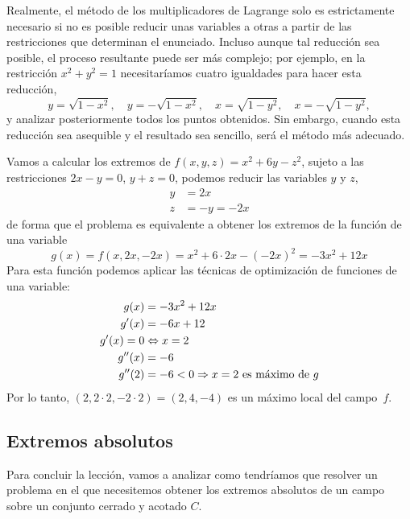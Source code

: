 Realmente, el método de los multiplicadores de Lagrange solo es estrictamente necesario si no es posible reducir unas variables a otras a partir de las restricciones que determinan el enunciado.
Incluso aunque tal reducción sea posible, el proceso resultante puede ser más complejo;
por ejemplo, en la restricción $x^2+y^2=1$ necesitaríamos cuatro igualdades para hacer esta reducción,
\[
y=\sqrt{1-x^2},\quad
y=-\sqrt{1-x^2},\quad
x=\sqrt{1-y^2},\quad
x=-\sqrt{1-y^2},
\]
y analizar posteriormente todos los puntos obtenidos.
Sin embargo, cuando esta reducción sea asequible y el resultado sea sencillo, será el método más adecuado.
%
\begin{ejemplo}
Vamos a calcular los extremos de $f(x,y,z)=x^2+6y-z^2$, sujeto a las restricciones $2x-y=0$, $y+z=0$, podemos reducir las variables $y$ y $z$,
\begin{align*}
y&=2x\\
z&=-y=-2x
\end{align*}
de forma que el problema es equivalente a obtener los extremos de la función de una variable
\[
g(x)=f(x,2x,-2x)=x^2+6\cdot 2x-(-2x)^2=-3x^2+12x
\]
Para esta función podemos aplicar las técnicas de optimización de funciones de una variable: 
\begin{align*}
g(x) &=-3x^2+12x \\
g'(x) &= -6x+12 \\
g'(x)=0 &\Leftrightarrow x=2\\
g''(x)&=-6\\
g''(2)&=-6< 0 \Rightarrow x=2 \text{ es máximo de $g$}
\end{align*}
Por lo tanto, $(2,2\cdot 2,-2\cdot 2)=(2,4,-4)$ es un máximo local del campo~$f$.\fej
\end{ejemplo}

\subsection{Extremos absolutos}\label{sec:absolutos}

Para concluir la lección, vamos a analizar como tendríamos que resolver un problema en el que necesitemos obtener los
extremos absolutos de un campo sobre un conjunto cerrado y acotado $C$.

